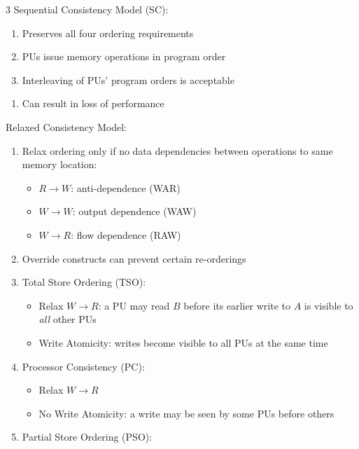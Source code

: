 \documentclass[12pt, a4paper]{article}
\begin{document}
\begin{multicols*}{3}
Sequential Consistency Model (SC):
\begin{enumerate}[\roman*.]
  \item Preserves all four ordering requirements
  \item PUs issue memory operations in program order
  \item Interleaving of PUs' program orders is acceptable
\end{enumerate}
\begin{enumerate}[$-$]\vspace{-2pt }
  \item Can result in loss of performance
\end{enumerate}

Relaxed Consistency Model:
\begin{enumerate}[\roman*.]
  \item Relax ordering only if no data dependencies between operations to same memory location:
    \begin{itemize}[leftmargin=*]\vspace{3pt}
      \item $R\rightarrow W$: anti-dependence (WAR)
      \item $W\rightarrow W$: output dependence (WAW)
      \item $W\rightarrow R$: flow dependence (RAW)
    \end{itemize}
  \item Override constructs can prevent certain re-orderings
  \item Total Store Ordering (TSO):
    \begin{itemize}[leftmargin=*]\vspace{3pt}
      \item Relax $W\rightarrow R$: a PU may read $B$ before its earlier write to $A$ is visible to \emph{all} other PUs
      \item Write Atomicity: writes become visible to all PUs at the same time 
    \end{itemize}
  \item Processor Consistency (PC):
    \begin{itemize}[leftmargin=*]\vspace{3pt}
      \item Relax $W\rightarrow R$
      \item No Write Atomicity: a write may be seen by some PUs before others
    \end{itemize}
  \item Partial Store Ordering (PSO): 

\end{enumerate}
\end{multicols*}
\end{document}
